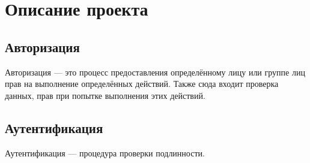 \section{Описание проекта}
\subsection{Авторизация}
Авторизация --- это процесс предоставления определённому лицу или группе лиц прав на выполнение определённых действий. Также сюда входит проверка данных, прав при попытке выполнения этих действий.

\subsection{Аутентификация}
Аутентификация --- процедура проверки подлинности.

\clearpage